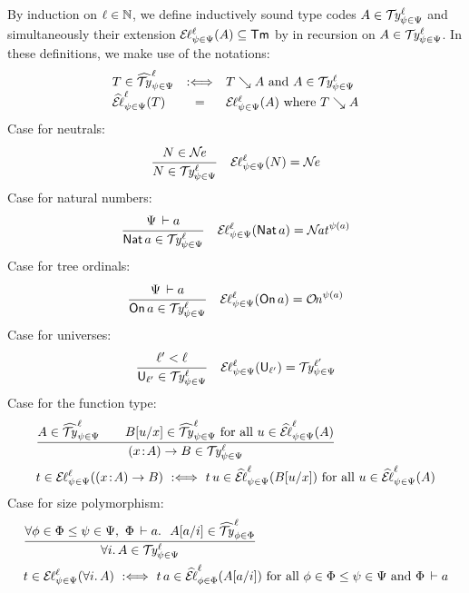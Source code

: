 \documentclass[acmsmall,screen]{acmart}\settopmatter{}
\renewcommand{\forallT}[2]{\forall #1.\,#2}
\begin{document}
By induction on $\ell \in \mathbb{N}$, we define inductively sound type codes
$A \in \mathcal{T}\kern-0.4ex\mathit{y}^{\ell}_{\psi\in\Psi}$ and simultaneously their extension
$\mathcal{E}\kern-0.2ex\ell^{\ell}_{\psi\in\Psi}(A) \subseteq \mathsf{Tm}$ by in recursion on
$A \in \mathcal{T}\kern-0.4ex\mathit{y}^{\ell}_{\psi\in\Psi}$.
In these definitions, we make use of the notations:
\[
\begin{array}{lcl}
  T \in \widehat{\mathcal{T}\kern-0.4ex\mathit{y}}^{\ell}_{\psi\in\Psi}
    & \mathrel{:\Longleftrightarrow} & T \searrow A \ \mbox{and}\  A \in \mathcal{T}\kern-0.4ex\mathit{y}^{\ell}_{\psi\in\Psi}
\\
  \widehat{\mathcal{E}\kern-0.2ex\ell}^{\ell}_{\psi\in\Psi}(T)
    & = & \mathcal{E}\kern-0.2ex\ell^{\ell}_{\psi\in\Psi}(A) \ \mbox{where}\  T \searrow A
\end{array}
\]
Case for neutrals:
\begin{align*}
  & \ru{N \in \NE}{N \in \TY \Psi \psi \ell}
  &
  \EL \Psi \psi \ell N = \NE
\end{align*}
Case for natural numbers:
\begin{align*}
  & \ru{\Psi \der a
      }{\Nat a \in \TY \Psi \psi \ell}
  & \EL \Psi \psi \ell {\Nat a}
    = \NAT^{\psi(a)}
\end{align*}
Case for tree ordinals:
\begin{align*}
  & \ru{\Psi \der a
      }{\On a \in \TY \Psi \psi \ell}
  & \EL \Psi \psi \ell {\On a}
    = \ON^{\psi(a)}
\end{align*}
Case for universes:
\begin{align*}
  & \ru{\ell' < \ell
      }{\Univ{\ell'} \in \TY \Psi \psi \ell}
  & \EL \Psi \psi \ell{\Univ{\ell'}}
    =
    \TY \Psi \psi {\ell'}
\end{align*}
Case for the function type:
\begin{align*}
  & \ru{A \in \TYhat \Psi \psi \ell \qquad
        \subst u x B \in \TYhat \Psi \psi \ell
        \mforall u \in \ELhat \Psi \psi \ell A
      }{\funT x A B \in \TY \Psi \psi \ell}
\\
  & t \in \EL \Psi \psi \ell {\funT x A B}
    \defas
    t\,u \in \ELhat \Psi \psi \ell {\subst u x B}
    \mforall u \in \ELhat \Psi \psi \ell A
\\
\end{align*}
Case for size polymorphism:
\begin{align*}
  & \ru{\forall \phi \in \Phi \leq \psi \in \Psi,\
        \Phi \der a.\ \
        \subst a i A \in \TYhat \Phi \phi \ell
      }{\forallT i A \in \TY \Psi \psi \ell}
\\
  & t \in \EL \Psi \psi \ell {\forallT i A}
    \defas
    t\,a \in \ELhat \Phi \phi \ell {\subst a i A}
    \mforall \phi \in \Phi \leq \psi \in \Psi
    \mand \Phi \der a
\end{align*}
\end{document}
